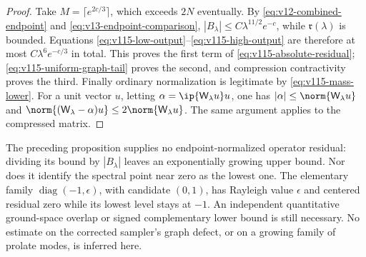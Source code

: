 \begin{proof}
Take $M=\lceil e^{2c/3}\rceil$, which exceeds $2N$ eventually.
By \eqref{eq:v12-combined-endpoint} and
\eqref{eq:v13-endpoint-comparison},
$|B_\lambda|\le C\lambda^{11/2}e^{-c}$, while
$\mathfrak r(\lambda)$ is bounded. Equations
\eqref{eq:v115-low-output}--\eqref{eq:v115-high-output} are therefore
at most $C\lambda^6e^{-c/3}$ in total. This proves the first term of
\eqref{eq:v115-absolute-residual};
\eqref{eq:v115-uniform-graph-tail} proves the second, and compression
contractivity proves the third.
Finally ordinary normalization is legitimate by
\eqref{eq:v115-mass-lower}. For a unit vector $u$, letting
$\alpha=\ip{\mathsf W_\lambda u}u$, one has
$|\alpha|\le\norm{\mathsf W_\lambda u}$ and
$\norm{(\mathsf W_\lambda-\alpha)u}\le2\norm{\mathsf W_\lambda u}$.
The same argument applies to the compressed matrix.
\end{proof}

The preceding proposition supplies no endpoint-normalized operator residual:
dividing its bound by $|B_\lambda|$ leaves an exponentially growing
upper bound. Nor does it identify the spectral point near zero as the
lowest one. The elementary family $\operatorname{diag}(-1,\epsilon)$,
with candidate $(0,1)$, has Rayleigh value $\epsilon$ and centered
residual zero while its lowest level stays at $-1$. An independent
quantitative ground-space overlap or signed complementary lower bound
is still necessary. No estimate on the corrected sampler's graph defect,
or on a growing family of prolate modes, is inferred here.
